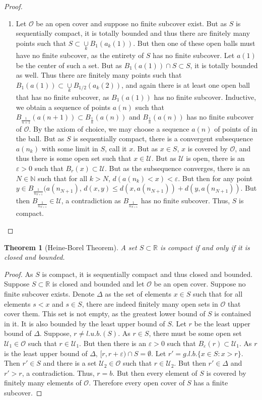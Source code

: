 \documentclass[12pt,oneside]{book}
\theoremstyle{mystyle}
\newtheorem{theorem}{Theorem}[section]
\begin{document}
\begin{proof}
\begin{enumerate}
\item Let $\mathcal{O}$ be an open cover and suppose no finite subcover exist. But as $S$ is sequentially compact, it is totally bounded and thus there are finitely many points such that $S\subset \underset{k}\cup B_{1}(a_k(1))$. But then one of these open balls must have no finite subcover, as the entirety of $S$ has no finite subcover. Let $a(1)$ be the center of such a set. But as $B_{1}(a(1))\cap S \subset S$, it is totally bounded as well. Thus there are finitely many points such that $B_{1}(a(1))\subset \underset{k}\cup B_{1/2}(a_k(2))$, and again there is at least one open ball that has no finite subcover, as $B_{1}(a(1))$ has no finite subcover. Inductive, we obtain a sequence of points $a(n)$ such that $B_{\frac{1}{n+1}}(a(n+1))\subset B_{\frac{1}{n}}(a(n))$ and $B_{\frac{1}{n}}(a(n))$ has no finite subcover of $\mathcal{O}$. By the axiom of choice, we may choose a sequence $a(n)$ of points of in the ball. But as $S$ is sequentially compact, there is a convergent subsequence $a(n_k)$ with some limit in $S$, call it $x$. But as $x\in S$, $x$ is covered by $\mathcal{O}$, and thus there is some open set such that $x\in \mathcal{U}$. But as $\mathcal{U}$ is open, there is an $\varepsilon>0$ such that $B_{r}(x)\subset \mathcal{U}$. But as the subsequence converges, there is an $N\in \mathbb{N}$ such that for all $k>N$, $d(a(n_k)<x) < \varepsilon$. But then for any point $y\in B_{\frac{1}{n_{N+1}}}(a(n_{N+1})$, $d(x,y) \leq d(x,a(n_{N+1}))+d(y,a(n_{N+1}))$. But then $B_{\frac{1}{n_{N+1}}}\in \mathcal{U}$, a contradiction as $B_{\frac{1}{n_{N+1}}}$ has no finite subcover. Thus, $S$ is compact. 
\end{enumerate}
\end{proof}

\begin{theorem}[Heine-Borel Theorem]
A set $S\subset \mathbb{R}$ is compact if and only if it is closed and bounded.
\end{theorem}
\begin{proof}
As $S$ is compact, it is sequentially compact and thus closed and bounded. Suppose $S\subset \mathbb{R}$ is closed and bounded and let $\mathcal{O}$ be an open cover. Suppose no finite subcover exists. Denote $\Delta$ as the set of elements $x\in S$ such that for all elements $s<x$ and $s\in S$, there are indeed finitely many open sets in $\mathcal{O}$ that cover them. This set is not empty, as the greatest lower bound of $S$ is contained in it. It is also bounded by the least upper bound of $S$. Let $r$ be the least upper bound of $\Delta$. Suppose, $r\ne l.u.b.(S)$. As $r\in S$, there must be some open set $\mathcal{U}_1\in \mathcal{O}$ such that $r\in \mathcal{U}_1$. But then there is an $\varepsilon>0$ such that $B_{\varepsilon}(r) \subset \mathcal{U}_1$. As $r$ is the least upper bound of $\Delta$, $[r,r+\varepsilon)\cap S = \emptyset$. Let $r' = g.l.b.\{x\in S: x>r\}$. Then $r'\in S$ and there is a set $\mathcal{U}_2 \in \mathcal{O}$ such that $r\in \mathcal{U}_2$. But then $r' \in \Delta$ and $r'>r$, a contradiction. Thus, $r=b$. But then every element of $S$ is covered by finitely many elements of $\mathcal{O}$. Therefore every open cover of $S$ has a finite subcover.
\end{proof}
\end{document}
